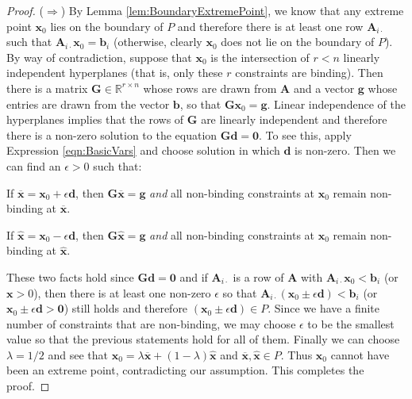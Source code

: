 \begin{proof}
($\Rightarrow$) By Lemma \ref{lem:BoundaryExtremePoint}, we know that any extreme point $\mathbf{x}_0$ lies on the boundary of $P$ and therefore there is at least one row $\mathbf{A}_{i\cdot}$ such that $\mathbf{A}_{i\cdot}\mathbf{x}_0 = \mathbf{b}_i$ (otherwise, clearly $\mathbf{x}_0$ does not lie on the boundary of $P$). By way of contradiction, suppose that $\mathbf{x}_0$ is the intersection of $r < n$ linearly independent hyperplanes (that is, only these $r$ constraints are binding). Then there is a matrix $\mathbf{G} \in \mathbb{R}^{r \times n}$ whose rows are drawn from $\mathbf{A}$ and a vector $\mathbf{g}$ whose entries are drawn from the vector $\mathbf{b}$, so that $\mathbf{G}\mathbf{x}_0 = \mathbf{g}$. Linear independence of the hyperplanes implies that the rows of $\mathbf{G}$ are linearly independent and therefore there is a non-zero solution to the equation $\mathbf{G}\mathbf{d} = \mathbf{0}$. To see this, apply Expression \ref{eqn:BasicVars} and choose solution in which $\mathbf{d}$ is non-zero. Then we can find an $\epsilon > 0$ such that:
\begin{enumerate*}
\item If $\overline{\mathbf{x}} = \mathbf{x}_0 + \epsilon\mathbf{d}$, then $\mathbf{G}\overline{\mathbf{x}} = \mathbf{g}$ \textit{and} all non-binding constraints at $\mathbf{x}_0$ remain non-binding at $\overline{\mathbf{x}}$.

\item If $\hat{\mathbf{x}} = \mathbf{x}_0 - \epsilon\mathbf{d}$, then $\mathbf{G}\hat{\mathbf{x}} = \mathbf{g}$ \textit{and} all non-binding constraints at $\mathbf{x}_0$ remain non-binding at $\hat{\mathbf{x}}$.
\end{enumerate*}
These two facts hold since $\mathbf{G}\mathbf{d} = \mathbf{0}$ and if $\mathbf{A}_{i\cdot}$ is a row of $\mathbf{A}$ with $\mathbf{A}_{i\cdot}\mathbf{x}_0 < \mathbf{b}_i$ (or $\mathbf{x} > 0$), then there is at least one non-zero $\epsilon$ so that $\mathbf{A}_{i\cdot}(\mathbf{x}_0 \pm \epsilon \mathbf{d}) < \mathbf{b}_i$ (or $\mathbf{x}_0 \pm \epsilon \mathbf{d} > \mathbf{0}$) still holds and therefore $(\mathbf{x}_0 \pm \epsilon \mathbf{d}) \in P$. Since we have a finite number of constraints that are non-binding, we may choose $\epsilon$ to be the smallest value so that the previous statements hold for all of them. Finally we can choose $\lambda = 1/2$ and see that $\mathbf{x}_0 = \lambda\overline{\mathbf{x}} + (1-\lambda)\hat{\mathbf{x}}$ and $\overline{\mathbf{x}}, \hat{\mathbf{x}} \in P$. Thus $\mathbf{x}_0$ cannot have been an extreme point, contradicting our assumption. This completes the proof.
\end{proof}

